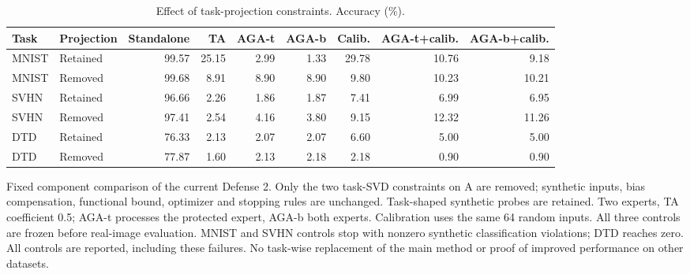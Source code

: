 \begin{table}[t]
\centering\small
\setlength{\tabcolsep}{4pt}
\caption{Effect of task-projection constraints. Accuracy (\%).}
\label{tab:defense2_projection}
\begin{tabular}{@{}llrrrrrrr@{}}
\toprule
Task & Projection & Standalone & TA & AGA-t & AGA-b & Calib. & AGA-t+calib. & AGA-b+calib. \\
\midrule
MNIST & Retained & 99.57 & 25.15 & 2.99 & 1.33 & 29.78 & 10.76 & 9.18 \\
MNIST & Removed & 99.68 & 8.91 & 8.90 & 8.90 & 9.80 & 10.23 & 10.21 \\
\midrule
SVHN & Retained & 96.66 & 2.26 & 1.86 & 1.87 & 7.41 & 6.99 & 6.95 \\
SVHN & Removed & 97.41 & 2.54 & 4.16 & 3.80 & 9.15 & 12.32 & 11.26 \\
\midrule
DTD & Retained & 76.33 & 2.13 & 2.07 & 2.07 & 6.60 & 5.00 & 5.00 \\
DTD & Removed & 77.87 & 1.60 & 2.13 & 2.18 & 2.18 & 0.90 & 0.90 \\
\bottomrule
\end{tabular}
\par\smallskip
\begin{minipage}{\textwidth}\footnotesize Fixed component comparison of the current Defense 2. Only the two task-SVD constraints on A are removed; synthetic inputs, bias compensation, functional bound, optimizer and stopping rules are unchanged. Task-shaped synthetic probes are retained. Two experts, TA coefficient 0.5; AGA-t processes the protected expert, AGA-b both experts. Calibration uses the same 64 random inputs. All three controls are frozen before real-image evaluation. MNIST and SVHN controls stop with nonzero synthetic classification violations; DTD reaches zero. All controls are reported, including these failures. No task-wise replacement of the main method or proof of improved performance on other datasets.\end{minipage}
\end{table}

